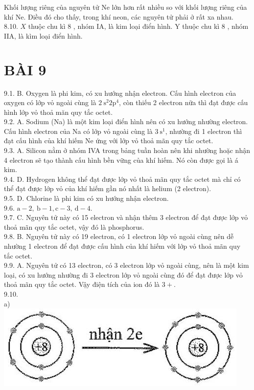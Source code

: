 \documentclass[10pt]{article}
\begin{document}
Khối lượng riêng của nguyên tử Ne lớn hơn rất nhiều so với khối lượng riêng của khí Ne. Điều đó cho thấy, trong khí neon, các nguyên tử phải ở rất xa nhau.\\
8.10. $X$ thuộc chu kì 8 , nhóm IA, là kim loại điển hình. Y thuộc chu kì 8 , nhóm IIA, là kìm loại điển hình.

\section*{BÀI 9}
9.1. B. Oxygen là phi kim, có xu hướng nhận electron. Cấu hình electron của oxygen có lớp vỏ ngoài cùng là $2 \mathrm{~s}^{2} 2 \mathrm{p}^{4}$, còn thiếu 2 electron nữa thì đạt được cấu hình lớp vỏ thoả măn quy tắc octet.\\
9.2. A. Sodium (Na) là một kim loại điển hình nên có xu hướng nhường electron. Cấu hình electron của Na có lớp vỏ ngoài cùng là $3 \mathrm{~s}^{1}$, nhường đi 1 electron thì đạt cấu hình của khí hiếm Ne ứng với lớp vỏ thoả mãn quy tắc octet.\\
9.3. A. Silicon nằm ở nhóm IVA trong bảng tuần hoàn nên khi nhường hoặc nhận 4 electron sẽ tạo thành cấu hình bền vững của khí hiếm. Nó còn được gọi là á kim.\\
9.4. D. Hydrogen không thể đạt được lớp vỏ thoả mãn quy tắc octet mà chỉ có thể đạt được lớp vỏ của khí hiếm gần nó nhất là helium (2 electron).\\
9.5. D. Chlorine là phi kim có xu hướng nhận electron.\\
9.6. $\mathrm{a}-2, \mathrm{~b}-1, \mathrm{c}-3, \mathrm{~d}-4$.\\
9.7. C. Nguyên tử này có 15 electron và nhận thêm 3 electron để đạt được lớp vỏ thoả mãn quy tắc octet, vậy đó là phosphorus.\\
9.8. B. Nguyên tử này có 19 electron, có 1 electron lớp vỏ ngoài cùng nên dễ nhường 1 electron để đạt được cấu hình của khí hiếm với lớp vỏ thoả mãn quy tắc octet.\\
9.9. A. Nguyên tử có 13 electron, có 3 electron lớp vỏ ngoài cùng, nên là một kim loại, có xu hướng nhường đi 3 electron lớp vỏ ngoài cùng đó để đạt được lớp vỏ thoả mãn quy tắc octet. Vậy điện tích của ion đó là $3+$.\\
9.10.\\
a)\\
\includegraphics[max width=\textwidth, center]{2025_10_23_baf6b6057fd5ebd09626g-12(1)}\\
\end{document}
